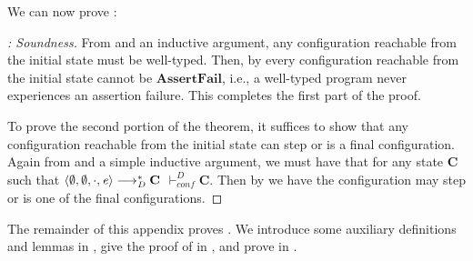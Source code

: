 We can now prove :
\begin{proof}[: Soundness]
  From  and an inductive argument, any configuration
  reachable from the initial state must be well-typed. Then, by  every
  configuration reachable from the initial state cannot be $ \mathbf{AssertFail} $, i.e., a well-typed
  program never experiences an assertion failure. This completes the first part of the proof.

  To prove the second portion of the theorem, it suffices to show that any configuration reachable
  from the initial state can step or is a final configuration. Again from
   and a simple inductive argument, we must have that
  for any state   $\mathbf{C}$ such that $  \left\langle{  \emptyset  ,   \emptyset  ,   \cdot  ,  \mathit{e} }\right\rangle     \longrightarrow^* _{ \mathit{D} }    \mathbf{C} $ $ \vdash_{\mathit{conf} }^D  \mathbf{C} $.
  Then by  we have the configuration may step or is one of the final configurations.
\end{proof}

The remainder of this appendix proves . We introduce some auxiliary definitions and
lemmas in , give the proof of  in , and prove
 in .

